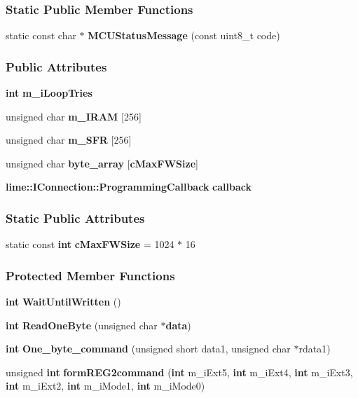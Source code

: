 \subsubsection*{Static Public Member Functions}
\begin{DoxyCompactItemize}
\item 
static const char $\ast$ {\bf M\+C\+U\+Status\+Message} (const uint8\+\_\+t code)
\end{DoxyCompactItemize}
\subsubsection*{Public Attributes}
\begin{DoxyCompactItemize}
\item 
{\bf int} {\bf m\+\_\+i\+Loop\+Tries}
\item 
unsigned char {\bf m\+\_\+\+I\+R\+AM} [256]
\item 
unsigned char {\bf m\+\_\+\+S\+FR} [256]
\item 
unsigned char {\bf byte\+\_\+array} [{\bf c\+Max\+F\+W\+Size}]
\item 
{\bf lime\+::\+I\+Connection\+::\+Programming\+Callback} {\bf callback}
\end{DoxyCompactItemize}
\subsubsection*{Static Public Attributes}
\begin{DoxyCompactItemize}
\item 
static const {\bf int} {\bf c\+Max\+F\+W\+Size} = 1024 $\ast$ 16
\end{DoxyCompactItemize}
\subsubsection*{Protected Member Functions}
\begin{DoxyCompactItemize}
\item 
{\bf int} {\bf Wait\+Until\+Written} ()
\item 
{\bf int} {\bf Read\+One\+Byte} (unsigned char $\ast${\bf data})
\item 
{\bf int} {\bf One\+\_\+byte\+\_\+command} (unsigned short data1, unsigned char $\ast$rdata1)
\item 
unsigned {\bf int} {\bf form\+R\+E\+G2command} ({\bf int} m\+\_\+i\+Ext5, {\bf int} m\+\_\+i\+Ext4, {\bf int} m\+\_\+i\+Ext3, {\bf int} m\+\_\+i\+Ext2, {\bf int} m\+\_\+i\+Mode1, {\bf int} m\+\_\+i\+Mode0)
\end{DoxyCompactItemize}
